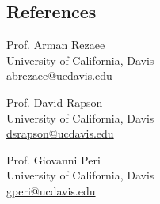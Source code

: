 \documentclass[10pt]{res} %
\begin{document}
\begin{resume}
		
		\section{References}
		\begin{multicols}{2}
			
			Prof. Arman Rezaee \\
			University of California, Davis \\
			\href{mailto:}{abrezaee@ucdavis.edu}
			
			
			\vfill\columnbreak
			
			Prof. David Rapson  \\
			University of California, Davis \\
			\href{mailto:}{dsrapson@ucdavis.edu}
			
		\end{multicols}
		
		Prof. Giovanni Peri  \\
		University of California, Davis \\
		\href{mailto:}{gperi@ucdavis.edu }
		
		
		
	\end{resume} 
\end{document}
